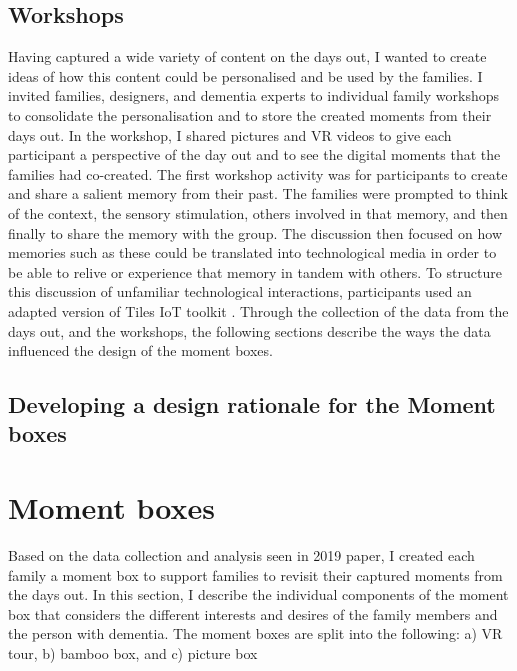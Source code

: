 \subsection{Workshops}
\label{workshops}
Having captured a wide variety of content on the days out, I wanted to create ideas of how this content could be personalised and be used by the families. I invited families, designers, and dementia experts to individual family workshops to consolidate the personalisation and to store the created moments from their days out. In the workshop, I shared pictures and VR videos to give each participant a perspective of the day out and to see the digital moments that the families had co-created. The first workshop activity was for participants to create and share a salient memory from their past. The families were prompted to think of the context, the sensory stimulation, others involved in that memory, and then finally to share the memory with the group. The discussion then focused on how memories such as these could be translated into technological media in order to be able to relive or experience that memory in tandem with others. To structure this discussion of unfamiliar technological interactions, participants used an adapted version of Tiles IoT toolkit \citep{mora2017tiles}. Through the collection of the data from the days out, and the workshops, the following sections describe the ways the data influenced the design of the moment boxes.


\subsection{Developing a design rationale for the Moment boxes}
\label{DesignRationale}


\section{Moment boxes}
\label{MomentBoxes}
Based on the data collection and analysis seen in 2019 paper, I created each family a moment box to support families to revisit their captured moments from the days out. In this section, I describe the individual components of the moment box that considers the different interests and desires of the family members and the person with dementia. The moment boxes are split into the following: a) VR tour, b) bamboo box, and c) picture box


